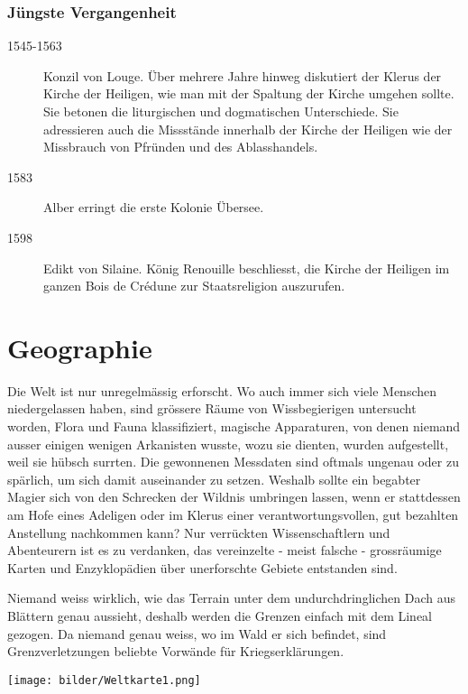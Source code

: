\documentclass[12pt,twoside,twocolumn,openany]{book}
\begin{document}
	\subsubsection{Jüngste Vergangenheit}
	\begin{description}
		\item[1545-1563] Konzil von Louge. Über mehrere Jahre hinweg diskutiert der Klerus der Kirche der Heiligen, wie man mit der Spaltung der Kirche umgehen sollte. Sie betonen die liturgischen und dogmatischen Unterschiede. Sie adressieren auch die Missstände innerhalb der Kirche der Heiligen wie der Missbrauch von Pfründen und des Ablasshandels.
		\item[1583] Alber erringt die erste Kolonie Übersee.
		\item[1598] Edikt von Silaine. König Renouille beschliesst, die Kirche der Heiligen im ganzen Bois de Crédune zur Staatsreligion auszurufen.
	\end{description}


\section{Geographie}
Die Welt ist nur unregelmässig erforscht. Wo auch immer sich viele Menschen niedergelassen haben, sind grössere Räume von Wissbegierigen untersucht worden, Flora und Fauna klassifiziert, magische Apparaturen, von denen niemand ausser einigen wenigen Arkanisten wusste, wozu sie dienten, wurden aufgestellt, weil sie hübsch surrten. Die gewonnenen Messdaten sind oftmals ungenau oder zu spärlich, um sich damit auseinander zu setzen. Weshalb sollte ein begabter Magier sich von den Schrecken der Wildnis umbringen lassen, wenn er stattdessen am Hofe eines Adeligen oder im Klerus einer verantwortungsvollen, gut bezahlten Anstellung nachkommen kann?
Nur verrückten Wissenschaftlern und Abenteurern ist es zu verdanken, das vereinzelte - meist falsche - grossräumige Karten und Enzyklopädien über unerforschte Gebiete entstanden sind.

Niemand weiss wirklich, wie das Terrain unter dem undurchdringlichen Dach aus Blättern genau aussieht, deshalb werden die Grenzen einfach mit dem Lineal gezogen. Da niemand genau weiss, wo im Wald er sich befindet, sind Grenzverletzungen beliebte Vorwände für Kriegserklärungen.


\begin{figure*}
	\centering
	\texttt{[image: bilder/Weltkarte1.png]}
\end{figure*}
\end{document}

